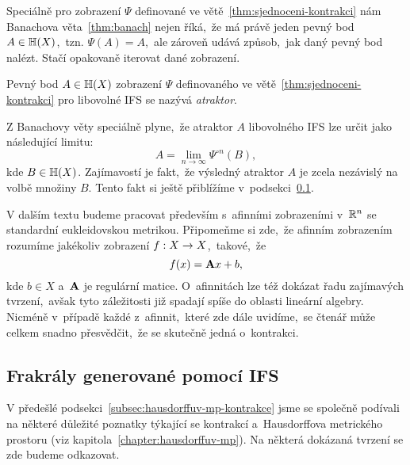 Speciálně pro zobrazení $\Psi$ definované ve větě~\ref{thm:sjednoceni-kontrakci} nám Banachova věta~\ref{thm:banach} nejen říká,~že má právě jeden pevný bod $A\in\mathbb{H}(X)$,~tzn. $\Psi(A)=A$,~ale zároveň udává způsob,~jak daný pevný bod nalézt. Stačí opakovaně iterovat dané zobrazení.
\begin{definition}[Atraktor]\label{def:atraktor}
    Pevný bod $A\in\mathbb{H}(X)$ zobrazení $\Psi$ definovaného ve větě~\ref{thm:sjednoceni-kontrakci} pro libovolné IFS se nazývá \emph{atraktor}.
\end{definition}
Z Banachovy věty speciálně plyne,~že atraktor $A$ libovolného IFS lze určit jako následující limitu:
\[A=\lim_{n\to\infty}\Psi^{\circ n}(B),\]
kde $B\in\mathbb{H}(X)$. Zajímavostí je fakt,~že výsledný atraktor $A$ je zcela nezávislý na volbě množiny $B$. Tento fakt si ještě přiblížíme v~podsekci~\ref{subsec:fraktaly-ifs}.

V dalším textu budeme pracovat především s~afinními zobrazeními v~$\mathbb{R}^n$ se standardní eukleidovskou metrikou. Připomeňme si zde,~že afinním zobrazením rozumíme jakékoliv zobrazení $f:X \rightarrow X$,~takové,~že
\[f(x)=\mathbf{A}x+b,\]
kde $b\in X$ a~$\mathbf{A}$ je regulární matice. O~afinnitách lze též dokázat řadu zajímavých tvrzení,~avšak tyto záležitosti již spadají spíše do oblasti lineární algebry. Nicméně v~případě každé z~afinnit,~které zde dále uvidíme,~se čtenář může celkem snadno přesvědčit,~že se skutečně jedná o~kontrakci.

\subsection{Frakrály generované pomocí IFS}\label{subsec:fraktaly-ifs}

V předešlé podsekci~\ref{subsec:hausdorffuv-mp-kontrakce} jsme se společně podívali na některé důležité poznatky týkající se kontrakcí a~Hausdorffova metrického prostoru (viz kapitola~\ref{chapter:hausdorffuv-mp}). Na některá dokázaná tvrzení se zde budeme odkazovat.

